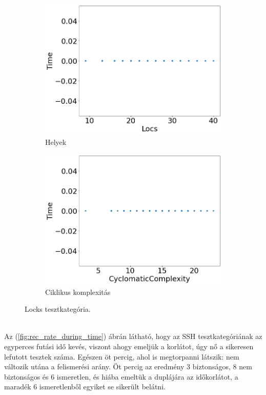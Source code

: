 \begin{figure}[ht]
\begin{subfigure}[b]{0.5\linewidth}
		\includegraphics[width=0.95\linewidth]{figures/locks/locs.png} 
		\caption{Helyek} 
	\end{subfigure}%
	\begin{subfigure}[b]{0.5\linewidth}
		\centering
		\includegraphics[width=0.95\linewidth]{figures/locks/cc.png} 
		\caption{Ciklikus komplexitás} 
	\end{subfigure} 
	\caption{Locks tesztkategória.\label{fig:locks} }
\end{figure}
\ \\
Az (\ref{fig:rec_rate_during_time}) ábrán látható, hogy az SSH tesztkategóriának az egyperces futási idő kevés, viszont ahogy emeljük a korlátot, úgy nő a sikeresen lefutott tesztek száma. Egészen öt percig, ahol is megtorpanni látszik: nem változik utána a felismerési arány. Öt percig az eredmény 3 biztonságos, 8 nem biztonságos és 6 ismeretlen, és hiába emeltük a duplájára az időkorlátot, a maradék 6 ismeretlenből egyiket se sikerült belátni. 

